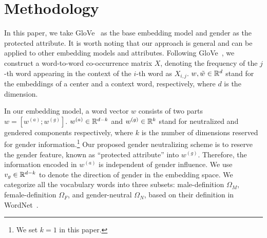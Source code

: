 \section{Methodology}
\label{sec:methodology}
In this paper, we take GloVe~\cite{glove} as the base embedding model and gender as the protected attribute. 
It is worth noting that our approach is general and can be applied to other embedding models and attributes. 
Following GloVe~\cite{glove}, we construct a word-to-word co-occurrence matrix $X$, denoting the frequency of the $j$-th word appearing in the context of the $i$-th word as $X_{i,j}$. 
$w, \tilde{w} \in \mathbb{R}^{d}$  stand for the embeddings of a center and a context word, respectively, where $d$ is the dimension.


In our embedding model, a word vector $w$ consists of two parts $w=[w^{(a)};w^{(g)}]$.
$w^{(a)}\in\mathbb{R}^{d-k}$ and $w^{(g)}\in\mathbb{R}^{k}$ stand for neutralized and gendered components respectively,
where $k$ is the number of dimensions reserved for gender information.\footnote{We set $k=1$ in this paper.}
Our proposed gender neutralizing scheme is to reserve the gender feature, known as ``protected attribute'' into $w^{(g)}$. 
Therefore, the information encoded in $w^{(a)}$ is  independent of gender influence. 
We use $v_g \in \mathbb{R}^{d-k}$ to denote the direction of gender in the embedding space.
We categorize all the vocabulary words into three subsets: male-definition $\Omega_M$, female-definition $\Omega_F$, and gender-neutral $\Omega_N$,  based on their definition in  WordNet~\cite{miller1998wordnet}.%

